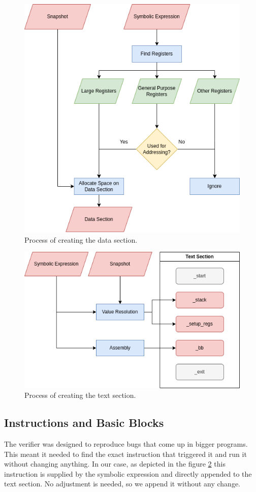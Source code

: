 \begin{figure}[ht]
    \centering
    \includegraphics[width=0.8\linewidth]{figures/data}
    \caption{Process of creating the data section.}
    \label{fig:data}
\end{figure}

\begin{figure}[ht]
    \centering
    \includegraphics[width=0.8\linewidth]{figures/text}
    \caption{Process of creating the text section.}
    \label{fig:text}
\end{figure}

\subsection{Instructions and Basic Blocks}
The verifier was designed to reproduce bugs that come up in bigger programs.
This meant it needed to find the exact instruction that triggered it and run it without changing anything.
In our case, as depicted in the figure \ref{fig:text} this instruction is supplied by the symbolic expression and directly appended to the text section.
No adjustment is needed, so we append it without any change.

